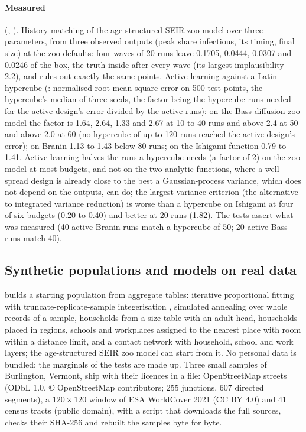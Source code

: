 \paragraph{Measured} (, ). History matching of the
age-structured SEIR zoo model over three parameters, from three observed outputs (peak share
infectious, its timing, final size) at the zoo defaults: four waves of 20 runs leave 0.1705,
0.0444, 0.0307 and 0.0246 of the box, the truth inside after every wave (its largest
implausibility 2.2), and  rules out exactly the same points.
Active learning against a Latin hypercube (:
normalised root-mean-square error on 500 test points, the hypercube's median of three seeds,
the factor being the hypercube runs needed for the active design's error divided by the
active runs): on the Bass diffusion zoo model the factor is 1.64, 2.64, 1.33 and 2.67 at 10
to 40 runs and above 2.4 at 50 and above 2.0 at 60 (no hypercube of up to 120 runs reached the active
design's error); on Branin \citep{dixon1978towards} 1.13 to 1.43 below
80 runs; on the Ishigami function 0.79 to 1.41. Active learning halves the runs a
hypercube needs (a factor of 2) on the zoo model at most budgets, and not on the two
analytic functions, where a well-spread design is already close to the best a
Gaussian-process variance, which does not depend on the outputs, can do; the largest-variance
criterion (the alternative to integrated variance reduction) is worse than a hypercube on
Ishigami at four of six budgets (0.20 to 0.40) and better at 20 runs (1.82). The tests assert what was
measured (40 active Branin runs match a hypercube of 50; 20 active Bass runs match 40).

\subsection{Synthetic populations and models on real data}
\label{app:population}

 builds a starting population from aggregate tables: iterative
proportional fitting \citep{deming1940least} with truncate-replicate-sample integerisation
\citep{lovelace2013truncate}, simulated annealing over whole records of a sample, households
from a size table with an adult head, households placed in regions, schools and workplaces
assigned to the nearest place with room within a distance limit, and a contact network with
household, school and work layers; the age-structured SEIR zoo model can start from it. No
personal data is bundled: the marginals of the tests are made up. Three small samples of
Burlington, Vermont, ship with their licences in a  file: OpenStreetMap streets
(ODbL 1.0, © OpenStreetMap contributors; 255 junctions, 607 directed segments), a $120
\times 120$ window of ESA WorldCover 2021 \citep{zanaga2022worldcover} (CC BY 4.0) and 41
census tracts (public domain), with a script that downloads the full sources, checks their
SHA-256 and rebuilt the samples byte for byte.

